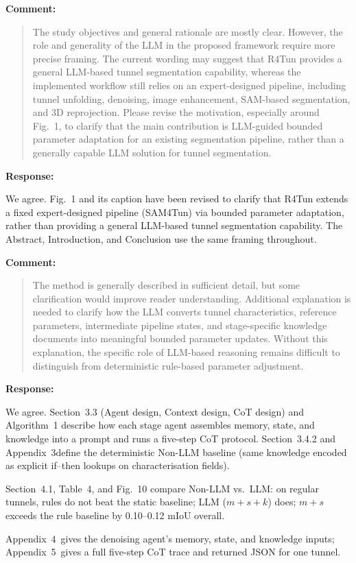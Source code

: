 \documentclass[11pt,a4paper]{article}
\newcommand{\MSAblationBarFigure}{Fig.~10}
\newcommand{\MSAppendixRuleBaseline}{Appendix~3}
\newcommand{\MSAppendixContext}{Appendix~4}
\newcommand{\MSAppendixCoT}{Appendix~5}
\newenvironment{commentblock}{%
  \par\smallskip\noindent\textbf{Comment:}\par
  \begin{quote}\itshape\color{black}
}{%
  \end{quote}\smallskip
}
\newenvironment{responseblock}{%
  \par\smallskip\noindent\textbf{Response:}\par
  \begingroup\color{responsegreen}
}{%
  \endgroup\smallskip
}
\begin{document}
\begin{commentblock}
The study objectives and general rationale are mostly clear. However, the role and generality of the LLM in the proposed framework require more precise framing. The current wording may suggest that R4Tun provides a general LLM-based tunnel segmentation capability, whereas the implemented workflow still relies on an expert-designed pipeline, including tunnel unfolding, denoising, image enhancement, SAM-based segmentation, and 3D reprojection. Please revise the motivation, especially around Fig.~1, to clarify that the main contribution is LLM-guided bounded parameter adaptation for an existing segmentation pipeline, rather than a generally capable LLM solution for tunnel segmentation.
\end{commentblock}
\begin{responseblock}
We agree. Fig.~1 and its caption have been revised to clarify that R4Tun extends a fixed expert-designed pipeline (SAM4Tun) via bounded parameter adaptation, rather than providing a general LLM-based tunnel segmentation capability. The Abstract, Introduction, and Conclusion use the same framing throughout.
\end{responseblock}

\begin{commentblock}
The method is generally described in sufficient detail, but some clarification would improve reader understanding. Additional explanation is needed to clarify how the LLM converts tunnel characteristics, reference parameters, intermediate pipeline states, and stage-specific knowledge documents into meaningful bounded parameter updates. Without this explanation, the specific role of LLM-based reasoning remains difficult to distinguish from deterministic rule-based parameter adjustment.
\end{commentblock}
\begin{responseblock}
We agree. Section~3.3 (Agent design, Context design, CoT design) and Algorithm~1 describe how each stage agent assembles memory, state, and knowledge into a prompt and runs a five-step CoT protocol. Section~3.4.2 and \MSAppendixRuleBaseline define the deterministic Non-LLM baseline (same knowledge encoded as explicit if--then lookups on characterisation fields).

Section~4.1, Table~4, and \MSAblationBarFigure{} compare Non-LLM vs.\ LLM: on regular tunnels, rules do not beat the static baseline; LLM ($m+s+k$) does; $m+s$ exceeds the rule baseline by 0.10--0.12 mIoU overall.

\MSAppendixContext \ gives the denoising agent's memory, state, and knowledge inputs; \MSAppendixCoT \ gives a full five-step CoT trace and returned JSON for one tunnel.
\end{responseblock}
\end{document}
